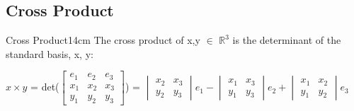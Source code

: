     \vspace{0.5cm}




\subsection{ Cross Product }

    \begin{definition}{Cross Product}{14cm}
        The {\color{lblue} cross product} of x,y $\in$ $\mathbb{R}^3$
        is the determinant of the standard basis, x, y:

        \hspace{0.5cm}
        $x \times y$ =
        det($
        \begin{bmatrix}
            e_1 & e_2 & e_3 \\
            x_1 & x_2 & x_3 \\
            y_1 & y_2 & y_3 
        \end{bmatrix}$)
        =
        $\begin{vmatrix}
            x_2 & x_3 \\
            y_2 & y_3 
        \end{vmatrix}e_1
        - \begin{vmatrix}
            x_1 & x_3 \\
            y_1 & y_3 
        \end{vmatrix}e_2
        + \begin{vmatrix}
            x_1 & x_2 \\
            y_1 & y_2 
        \end{vmatrix}e_3$
    \end{definition}

    \vspace{0.5cm}



